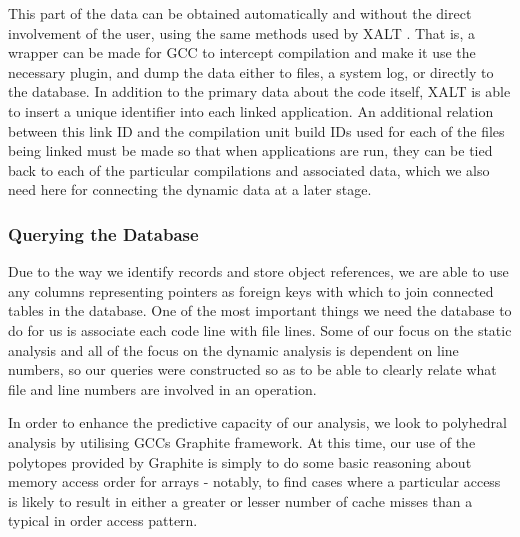 This part of the data can be obtained automatically and without the direct involvement of the user, using the same methods used by XALT \cite{7081224}.
That is, a wrapper can be made for \ac{GCC} to intercept compilation and make it use the necessary plugin, and dump the data either to files, a system log, or directly to the database.
In addition to the primary data about the code itself, XALT is able to insert a unique identifier into each linked application.
An additional relation between this link ID and the compilation unit build IDs used for each of the files being linked must be made so that when applications are run, they can be tied back to each of the particular compilations and associated data, which we also need here for connecting the dynamic data at a later stage.
\subsubsection{Querying the Database}
Due to the way we identify records and store object references, we are able to use any columns representing pointers as foreign keys with which to join connected tables in the database.
One of the most important things we need the database to do for us is associate each code line with file lines.
Some of our focus on the static analysis and all of the focus on the dynamic analysis is dependent on line numbers, so our queries were constructed so as to be able to clearly relate what file and line numbers are involved in an operation.

In order to enhance the predictive capacity of our analysis, we look to polyhedral analysis by utilising \acsp{GCC} Graphite framework\cite{trifunovic:inria-00551516}.
At this time, our use of the polytopes provided by Graphite is simply to do some basic reasoning about memory access order for arrays - notably, to find cases where a particular access is likely to result in either a greater or lesser number of cache misses than a typical in order access pattern.


